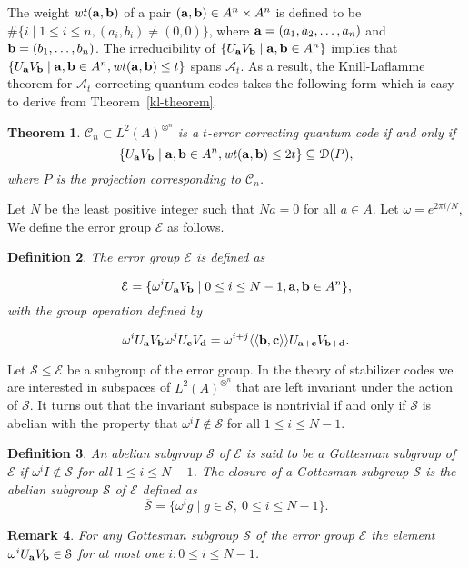 \documentclass{Rinton-P9x6}
\newtheorem{theorem}{Theorem}[section]
\newtheorem{definition}[theorem]{Definition}
\newtheorem{remark}[theorem]{Remark}
\renewcommand{\a}{{\bf a}}
\renewcommand{\b}{{\bf b}}
\renewcommand{\c}{{\bf c}}
\renewcommand{\d}{{\bf d}}
\newcommand{\om}{{\omega}}
\newcommand{\wt}{{\it wt}}
\newcommand{\A}{{\ensuremath{\mathcal{A}}}}
\newcommand{\C}{{\ensuremath{\mathcal{C}}}}
\renewcommand{\S}{{\ensuremath{\mathcal{S}}}}
\newcommand{\cS}{{\ensuremath{\overline{\mathcal{S}}}}}
\newcommand{\E}{{\ensuremath{\mathcal{E}}}}
\newcommand{\D}{{\ensuremath{\mathcal{D}}}}
\newcommand{\biangle}[1]{\langle\langle #1\rangle\rangle}
\begin{document}
The weight $\wt(\a,\b)$ of a pair $(\a,\b)\in A^n\times A^n$ is
defined to be $\#\{i\mid 1\leq i\leq n, (a_i,b_i)\neq (0,0)\}$, where
$\a=(a_1,a_2,\ldots,a_n)$ and $\b=(b_1,\ldots,b_n)$. The
irreducibility of $\{U_{\a}V_{\b}\mid \a, \b\in A^n\}$ implies that
$\{U_{\a}V_{\b}\mid \a, \b\in A^n, \wt(\a,\b)\leq t\}$ spans $\A_t$.
As a result, the Knill-Laflamme theorem for $\A_t$-correcting quantum
codes takes the following form which is easy to derive from
Theorem~\ref{kl-theorem}.

\begin{theorem}\label{kl-2}
  $\C_n\subset L^2(A)^{\otimes^n}$ is a $t$-error correcting quantum
  code if and only if 
\[
\{U_{\a}V_{\b}\mid \a, \b\in A^n, \wt(\a,\b)\leq 2t\}\subseteq\D(P),
\]
where $P$ is the projection corresponding to $\C_n$.
\end{theorem}

Let $N$ be the least positive integer such that $Na = 0$ for all $a
\in A$. Let $\om=e^{2\pi i/N}$, We define the error group $\E$ as
follows.

\begin{definition}
  The \emph{error group} $\E$ is defined as

\[ 
\E = \{\om^iU_{\a}V_{\b}\mid 0\leq i\leq N-1,\a, \b \in A^n\},
\]
with the group operation defined by

\[ 
\om^iU_{\a}V_{\b}\om^jU_{\c}V_{\d}=\om^{i+j}\biangle{\b,\c}U_{\a+\c}V_{\b+\d}.
\]

\end{definition}

Let $\S \leq \E$ be a subgroup of the error group. In the theory of
stabilizer codes we are interested in subspaces of
$L^2(A)^{\otimes^n}$ that are left invariant under the action of $\S$.
It turns out that the invariant subspace is nontrivial if and only if
$\S$ is abelian with the property that $\omega^i I \not \in \S$ for
all $1 \leq i \leq N -1$.

\begin{definition}\label{gottes}
  An abelian subgroup $\S$ of $\E$ is said to be a \emph{Gottesman
    subgroup} of $\E$ if $\omega^i I \not \in \S$ for all $1 \leq i
  \leq N -1$. The \emph{closure} of a Gottesman subgroup $\S$ is the
  abelian subgroup $\cS$ of $\E$ defined as
\[
\cS=\{\om^i g\mid g\in\S,\ 0\leq i \leq N -1\}.
\]
\end{definition}

\begin{remark}
  For any Gottesman subgroup $\S$ of the error group $\E$ the element
  $\omega^i U_{\a} V_{\b}\in\S$ for at most one $i: 0\leq i\leq N-1$.
\end{remark}
\end{document}
